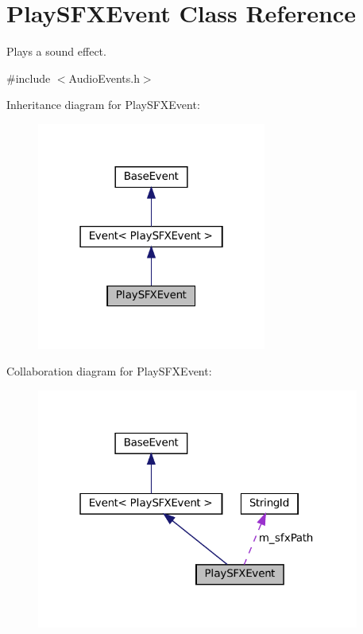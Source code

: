 \hypertarget{classPlaySFXEvent}{}\section{Play\+S\+F\+X\+Event Class Reference}
\label{classPlaySFXEvent}


Plays a sound effect.  




{\ttfamily \#include $<$Audio\+Events.\+h$>$}



Inheritance diagram for Play\+S\+F\+X\+Event\+:\nopagebreak
\begin{figure}[H]
\begin{center}
\leavevmode
\includegraphics[width=214pt]{classPlaySFXEvent__inherit__graph}
\end{center}
\end{figure}


Collaboration diagram for Play\+S\+F\+X\+Event\+:\nopagebreak
\begin{figure}[H]
\begin{center}
\leavevmode
\includegraphics[width=301pt]{classPlaySFXEvent__coll__graph}
\end{center}
\end{figure}
